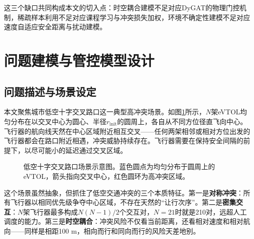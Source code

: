 \documentclass[12pt,a4paper,UTF8]{ctexart}
\begin{document}
这三个缺口共同构成本文的切入点：时空耦合建模不足对应DyGAT的物理门控机制，稀疏样本利用不足对应课程学习与冲突损失加权，环境不确定性建模不足对应速度自适应安全距离与扰动建模。

\section{问题建模与管控模型设计}

\subsection{问题描述与场景设定}

本文聚焦城市低空十字交叉路口这一典型高冲突场景。如图\ref{fig:scenario}所示，$N$架eVTOL均匀分布在以交叉中心为圆心、半径$r_{\text{init}}$的圆周上，各自从不同方位径直飞向中心。飞行器的航向线天然在中心区域附近相互交叉——任何两架相邻或相对方位出发的飞行器都会在路口附近相遇，冲突威胁持续存在。飞行器需要在保持安全间隔的前提下，以尽可能小的延迟通过交叉区域。

\begin{figure}[H]
    \centering
    \begin{minipage}[c]{0.7\textwidth}
    \centering
    \end{minipage}
    \caption{低空十字交叉路口场景示意图。蓝色圆点为均匀分布于圆周上的eVTOL，箭头指向交叉中心，红色圆环为高冲突区域。}
    \label{fig:scenario}
\end{figure}

这个场景虽然抽象，但抓住了低空交通冲突的三个本质特征。第一是\textbf{对称冲突}：所有飞行器以相同优先级争夺中心区域，不存在天然的“让行次序”。第二是\textbf{密集交互}：$N$架飞行器最多构成$N(N-1)/2$个交互对，$N=21$时就是210对，远超人工调度的能力。第三是\textbf{时空耦合}：冲突风险不仅看当前距离，还看相对速度和相对航向——同样是相距100 m，相向而行和同向而行的风险天差地别。
\end{document}
